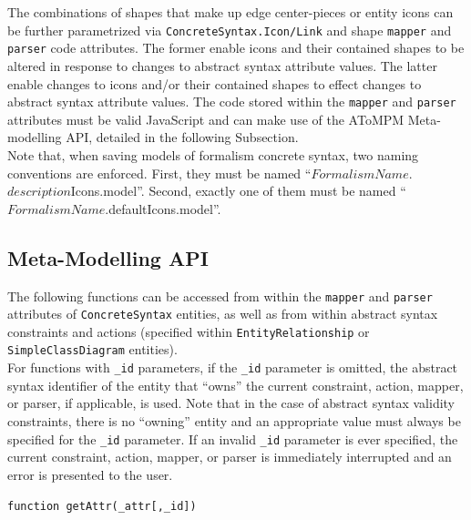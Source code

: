\documentclass{article}
\numberwithin{equation}{section}
\numberwithin{figure}{section}
\begin{document}
The combinations of shapes that make up edge center-pieces or entity icons can be further parametrized via \texttt{ConcreteSyntax.Icon/Link} and shape \texttt{mapper} and \texttt{parser} code attributes. The former enable icons and their contained shapes to be altered in response to changes to abstract syntax attribute values. The latter enable changes to icons and/or their contained shapes to effect changes to abstract syntax attribute values. The code stored within the \texttt{mapper} and \texttt{parser} attributes must be valid JavaScript and can make use of the AToMPM Meta-modelling API, detailed in the following Subsection.\\

Note that, when saving models of formalism concrete syntax, two naming conventions are enforced. First, they must be named ``$FormalismName$.$description$Icons.model''. Second, exactly one of them must be named ``$FormalismName$.defaultIcons.model''.



\subsection{Meta-Modelling API}
\label{ssec:mmmkapi}
The following functions can be accessed from within the \texttt{mapper} and \texttt{parser} attributes of \texttt{ConcreteSyntax} entities, as well as from within abstract syntax constraints and actions (specified within \texttt{EntityRelationship} or \texttt{SimpleClassDiagram} entities).\\

For functions with \texttt{\_id} parameters, if the \texttt{\_id} parameter is omitted, the abstract syntax identifier of the entity that ``owns'' the current constraint, action, mapper, or parser, if applicable, is used. Note that in the case of abstract syntax validity constraints, there is no ``owning'' entity and an appropriate value must always be specified for the \texttt{\_id} parameter. If an invalid \texttt{\_id} parameter is ever specified, the current constraint, action, mapper, or parser is immediately interrupted and an error is presented to the user.\\


\begin{center}	{\large \texttt{function getAttr(\_attr[,\_id])}} \end{center}
\end{document}
